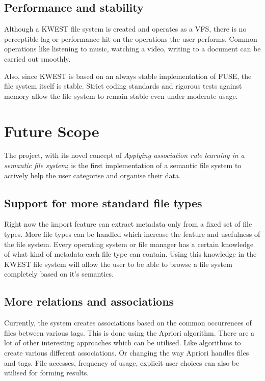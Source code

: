 \subsection*{Performance and stability}
Although a KWEST file system is created and operates as a VFS, there is no perceptible lag or performance hit on the operations the user performs. Common operations like listening to music, watching a video, writing to a document can be carried out smoothly.

Also, since KWEST is based on an always stable implementation of FUSE, the file system itself is stable. Strict coding standards and rigorous tests against memory allow the file system to remain stable even under moderate usage.


\section{Future Scope}

The project, with its novel concept of \textit{Applying association rule learning in a semantic file system}; is the first implementation of a semantic file system to actively help the user categorise and organise their data.

\subsection*{Support for more standard file types}
Right now the import feature can extract metadata only from a fixed set of file types. More file types can be handled which increase the feature and usefulness of the file system. Every operating system or file manager has a certain knowledge of what kind of metadata each file type can contain. Using this knowledge in the KWEST file system will allow the user to be able to browse a file system completely based on it's semantics.

\subsection*{More relations and associations}
Currently, the system creates associations based on the common occurrences of files between various tags. This is done using the Apriori algorithm. There are a lot of other interesting approaches which can be utilised. Like algorithms to create various different associations. Or changing the way Apriori handles files and tags. File accesses, frequency of usage, explicit user choices can also be utilised for forming results.

